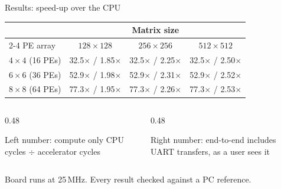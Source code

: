 \documentclass[aspectratio=169,11pt]{beamer}
\begin{document}
\begin{frame}{Results: speed-up over the CPU}
  \begin{center}
  \begin{tabular}{l ccc}
    \toprule
    & \multicolumn{3}{c}{Matrix size} \\
    \cmidrule(lr){2-4}
    PE array & $128\times128$ & $256\times256$ & $512\times512$ \\
    \midrule
    $4\times4$ (16 PEs) & 32.5$\times$ / 1.85$\times$ & 32.5$\times$ / 2.25$\times$ & 32.5$\times$ / 2.50$\times$ \\
    $6\times6$ (36 PEs) & 52.9$\times$ / 1.98$\times$ & 52.9$\times$ / 2.31$\times$ & 52.9$\times$ / 2.52$\times$ \\
    $8\times8$ (64 PEs) & 77.3$\times$ / 1.95$\times$ & 77.3$\times$ / 2.26$\times$ & 77.3$\times$ / 2.53$\times$ \\
    \bottomrule
  \end{tabular}
  \end{center}
  \vspace{4mm}
  \begin{columns}[T,onlytextwidth]
    \begin{column}{0.48\textwidth}
      \begin{block}{Left number: compute only}
        CPU cycles $\div$ accelerator cycles
      \end{block}
    \end{column}
    \begin{column}{0.48\textwidth}
      \begin{block}{Right number: end-to-end}
        includes UART transfers, as a user sees it
      \end{block}
    \end{column}
  \end{columns}
  \vspace{2mm}
  {\footnotesize Board runs at 25\,MHz. Every result checked against a PC reference.}
\end{frame}
\end{document}
